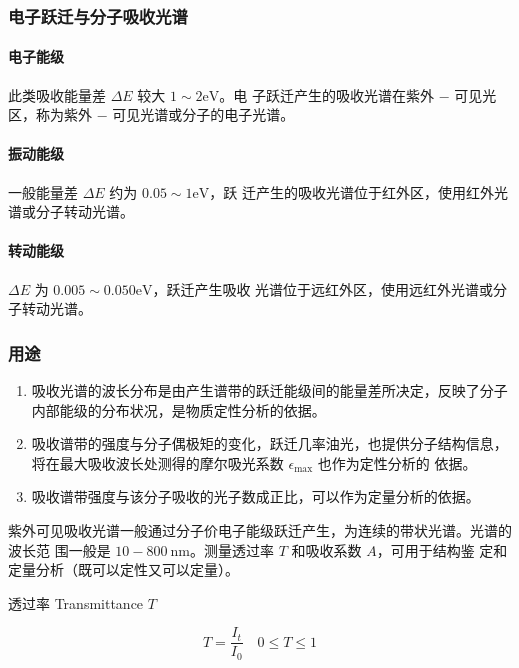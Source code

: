 \subsubsection{电子跃迁与分子吸收光谱}

\paragraph{电子能级} 此类吸收能量差 $\Delta E$ 较大 $1 \sim 2 \mathrm{eV}$。电
子跃迁产生的吸收光谱在紫外 $-$ 可见光区，称为紫外 $-$ 可见光谱或分子的电子光谱。

\paragraph{振动能级} 一般能量差 $\Delta E$ 约为 $ 0.05 \sim 1 \mathrm{eV}$，跃
迁产生的吸收光谱位于红外区，使用红外光谱或分子转动光谱。

\paragraph{转动能级} $\Delta E$ 为 $0.005 \sim 0.050 \mathrm{eV}$，跃迁产生吸收
光谱位于远红外区，使用远红外光谱或分子转动光谱。

\subsubsection{用途}

\begin{enumerate}
    \item 吸收光谱的波长分布是由产生谱带的跃迁能级间的能量差所决定，反映了分子
          内部能级的分布状况，是物质定性分析的依据。
    \item 吸收谱带的强度与分子偶极矩的变化，跃迁几率油光，也提供分子结构信息，
          将在最大吸收波长处测得的摩尔吸光系数 $\epsilon_{\max}$ 也作为定性分析的
          依据。
    \item 吸收谱带强度与该分子吸收的光子数成正比，可以作为定量分析的依据。
\end{enumerate}

紫外可见吸收光谱一般通过分子价电子能级跃迁产生，为连续的带状光谱。光谱的波长范
围一般是 $10 - 800 \ \mathrm{nm}$。测量透过率 $T$ 和吸收系数 $A$，可用于结构鉴
定和定量分析（既可以定性又可以定量）。

透过率 Transmittance $T$

\begin{equation}
    T = \frac{I_t}{I_0} \quad 0 \leq T \le 1
\end{equation}


